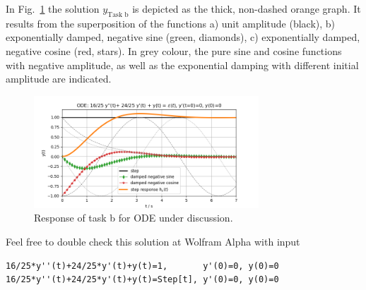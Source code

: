 In Fig.~\ref{fig:step_response_parts} the solution $y_\text{Task b}$ is depicted
as the thick, non-dashed orange graph. It results from the superposition of the
functions
a) unit amplitude (black),
b) exponentially damped, negative sine (green, diamonds),
c) exponentially damped, negative cosine (red, stars).
In grey colour, the pure sine and cosine functions with negative amplitude,
as well as the exponential
damping with different initial amplitude are indicated.

\begin{figure}[h!]
\centering
\includegraphics[width=0.75\textwidth]{../laplace_transform/step_response_parts}
\caption{Response of task b for ODE under discussion.}
\label{fig:step_response_parts}
\end{figure}

Feel free to double check this solution at Wolfram Alpha with input
\begin{verbatim}
16/25*y''(t)+24/25*y'(t)+y(t)=1,       y'(0)=0, y(0)=0
16/25*y''(t)+24/25*y'(t)+y(t)=Step[t], y'(0)=0, y(0)=0
\end{verbatim}




